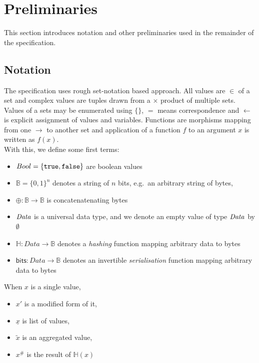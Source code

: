 \clearpage
\section{Preliminaries}\label{sec:prel}

This section introduces notation and other preliminaries used in the remainder
of the specification.

\subsection{Notation}

The specification uses rough set-notation based approach. All
values are $\in$ of a set and complex values are tuples drawn from a $\times$
product of multiple sets. Values of a sets may be enumerated using $\{\}$, $=$
means correspondence and $\gets$ is explicit assignment of values and variables.
Functions are morphisms mapping from one $\to$ to another set and application of
a function $f$ to an argument $x$ is written as $f(x)$. \\

\noindent With this, we define some first terms:

\begin{itemize}
  \item $Bool = \{\mathtt{true}, \mathtt{false}\}$ are boolean values
  \item $\mathbb{B} = {\{0,1\}}^n$ denotes a string of $n$ bits, e.g.\ an arbitrary
        string of bytes,
  \item $\oplus : \mathbb{B} \to \mathbb{B}$ is concatenatenating bytes
  \item $\mathit{Data}$ is a universal data type, and we denote an empty value of type $\mathit{Data}$ by $\emptyset$
  \item $\mathbb{H} : Data \to \mathbb{B}$ denotes a \emph{hashing} function
        mapping arbitrary data to bytes
  \item $\mathsf{bits} : Data \to \mathbb{B}$ denotes an invertible
        \emph{serialisation} function mapping arbitrary data to bytes
\end{itemize}

\noindent When $x$ is a single value,
\begin{itemize}
  \item $x'$ is a modified form of it,
  \item $\underline{x}$ is list of values,
  \item $\tilde{x}$ is an aggregated value,
  \item $x^{\#}$ is the result of $\mathbb{H}(x)$
\end{itemize}

